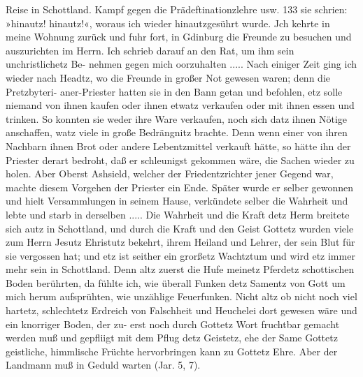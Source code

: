 Reise in Schottland. Kampf gegen die Prädeftinationzlehre usw. 133
sie schrien: »hinautz! hinautz!«, woraus ich wieder hinautzgesührt
wurde. Jch kehrte in meine Wohnung zurück und fuhr fort, in
Gdinburg die Freunde zu besuchen und auszurichten im Herrn.
Ich schrieb darauf an den Rat, um ihm sein unchristlichetz Be-
nehmen gegen mich oorzuhalten .....
Nach einiger Zeit ging ich wieder nach Headtz, wo die
Freunde in großer Not gewesen waren; denn die Pretzbyteri-
aner-Priester hatten sie in den Bann getan und befohlen,
etz solle niemand von ihnen kaufen oder ihnen etwatz
verkaufen oder mit ihnen essen und trinken. So konnten sie weder
ihre Ware verkaufen, noch sich datz ihnen Nötige anschaffen, watz
viele in große Bedrängnitz brachte. Denn wenn einer von ihren
Nachbarn ihnen Brot oder andere Lebentzmittel verkauft hätte, so
hätte ihn der Priester derart bedroht, daß er schleunigst gekommen
wäre, die Sachen wieder zu holen. Aber Oberst Ashsield, welcher
der Friedentzrichter jener Gegend war, machte diesem Vorgehen
der Priester ein Ende. Später wurde er selber gewonnen und hielt
Versammlungen in seinem Hause, verkündete selber die Wahrheit
und lebte und starb in derselben .....
Die Wahrheit und die Kraft detz Herm breitete sich autz in
Schottland, und durch die Kraft und den Geist Gottetz wurden
viele zum Herrn Jesutz Ehristutz bekehrt, ihrem Heiland und Lehrer,
der sein Blut für sie vergossen hat; und etz ist seither ein grorßetz
Wachtztum und wird etz immer mehr sein in Schottland. Denn
altz zuerst die Hufe meinetz Pferdetz schottischen Boden berührten,
da fühlte ich, wie überall Funken detz Samentz von Gott um mich
herum aufsprühten, wie unzählige Feuerfunken. Nicht altz ob
nicht noch viel hartetz, schlechtetz Erdreich von Falschheit und
Heuchelei dort gewesen wäre und ein knorriger Boden, der zu-
erst noch durch Gottetz Wort fruchtbar gemacht werden muß
und gepfliigt mit dem Pflug detz Geistetz, ehe der Same Gottetz
geistliche, himmlische Früchte hervorbringen kann zu Gottetz Ehre.
Aber der Landmann muß in Geduld warten (Jar. 5, 7).

